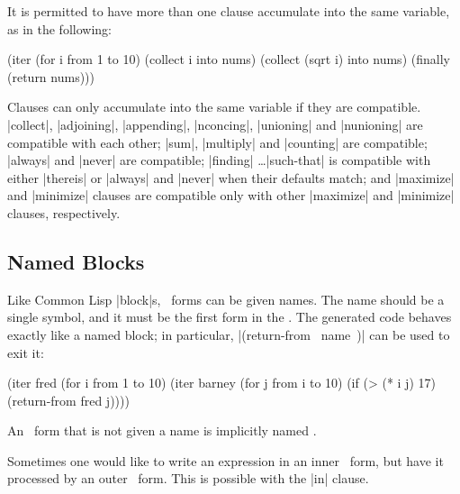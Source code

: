 \begin{sloppypar}
It is permitted to have more than one clause accumulate into the same
variable, as in the following:
\begin{program}
(iter (for i from 1 to 10)
      (collect i into nums)
      (collect (sqrt i) into nums)
      (finally (return nums)))
\end{program}
Clauses can only accumulate into the same variable if they are
compatible.  |collect|, |adjoining|, |appending|, |nconcing|,
|unioning| and |nunioning| are compatible with each other; |sum|,
|multiply| and |counting| are compatible; |always| and |never| are compatible;
|finding| \dots |such-that| is compatible with either |thereis| or |always|
and |never| when their defaults match; and |maximize| and |minimize| clauses
are compatible only with other |maximize| and |minimize| clauses,
respectively.

\end{sloppypar}

\subsection{Named Blocks}

Like Common Lisp |block|s, \iter\ forms can be given names.  The
name should be a single symbol, and it must be the first form in the
\iter.  The generated code behaves exactly like a named block; in
particular, |(return-from ~name~)| can be used to exit it:
\begin{program}
(iter fred
      (for i from 1 to 10)
      (iter barney
            (for j from i to 10)
            (if (> (* i j) 17)
                (return-from fred j))))
\end{program}
An \iter\ form that is not given a name is implicitly named \nil.

Sometimes one would like to write an expression in an inner \iter\ form,
but have it processed by an outer \iter\ form.  This is possible with
the |in| clause.  

